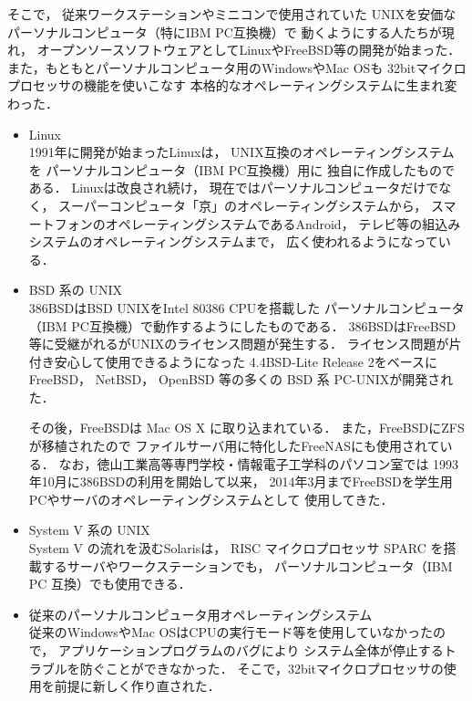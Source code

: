 \begin{enumerate}
    そこで，
    従来ワークステーションやミニコンで使用されていた
    UNIXを安価なパーソナルコンピュータ（特にIBM PC互換機）で
    動くようにする人たちが現れ，
    オープンソースソフトウェアとしてLinuxやFreeBSD等の開発が始まった．
    また，もともとパーソナルコンピュータ用のWindowsやMac OSも
    32bitマイクロプロセッサの機能を使いこなす
    本格的なオペレーティングシステムに生まれ変わった．

    \begin{itemize}
    \item Linux \\
      1991年に開発が始まったLinuxは，
      UNIX互換のオペレーティングシステムを
      パーソナルコンピュータ（IBM PC互換機）用に
      独自に作成したものである\cite{linux}．
      Linuxは改良され続け，
      現在ではパーソナルコンピュータだけでなく，
      スーパーコンピュータ「京」のオペレーティングシステム\cite{kei}から，
      スマートフォンのオペレーティングシステムであるAndroid\cite{android}，
      テレビ等の組込みシステムのオペレーティングシステムまで，
      広く使われるようになっている．

    \item BSD 系の UNIX \\
      386BSD\cite{386bsd}はBSD UNIXをIntel 80386 CPUを搭載した
      パーソナルコンピュータ（IBM PC互換機）で動作するようにしたものである．
      386BSDはFreeBSD等に受継がれるがUNIXのライセンス問題が発生する\cite{unix}．
      ライセンス問題が片付き安心して使用できるようになった
      4.4BSD-Lite Release 2\cite{unix}をベースに
      FreeBSD， NetBSD， OpenBSD 等の多くの BSD 系 PC-UNIXが開発された．

      その後，FreeBSDは Mac OS X に取り込まれている．
      また，FreeBSDにZFSが移植された\cite{zfs}ので
      ファイルサーバ用に特化したFreeNAS\cite{freenas}にも使用されている．
      なお，徳山工業高等専門学校・情報電子工学科のパソコン室では
      1993年10月に386BSDの利用を開始して以来，
      2014年3月までFreeBSDを学生用PCやサーバのオペレーティングシステムとして
      使用してきた\cite{iebsd}．

    \item System V 系の UNIX \\
      System V の流れを汲むSolaris\cite{solaris}は，
      RISC マイクロプロセッサ SPARC を搭載するサーバやワークステーションでも，
      パーソナルコンピュータ（IBM PC 互換）でも使用できる．

    \item 従来のパーソナルコンピュータ用オペレーティングシステム \\
      従来のWindowsやMac OSはCPUの実行モード等を使用していなかったので，
      アプリケーションプログラムのバグにより
      システム全体が停止するトラブルを防ぐことができなかった．
      そこで，32bitマイクロプロセッサの使用を前提に新しく作り直された．


\end{itemize}
\end{enumerate}
